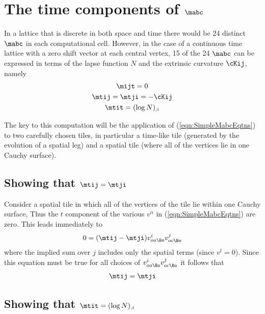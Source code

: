\documentclass[a4paper,12pt]{article}
\numberwithin{equation}{section}
\begin{document}
\section{The time components of $\mabc$}
\label{sec:TimeCompsMabc}

In a lattice that is discrete in both space and time there would be 24 distinct $\mabc$ in
each computational cell. However, in the case of a continuous time lattice with a zero shift
vector at each central vertex, 15 of the 24 $\mabc$ can be expressed in terms of the lapse
function $N$ and the extrinsic curvature $\cKij$, namely
\begin{gather}
   \mijt = 0\\
   \mtij = \mtji = - \cKij\\
   \mtit = (\log N)_{,i}
\end{gather}

The key to this computation will be the application of (\ref{eqn:SimpleMabcEqtns}) to two
carefully chosen tiles, in particular a time-like tile (generated by the evolution of a
spatial leg) and a spatial tile (where all of the vertices lie in one Cauchy surface).

\subsection*{Showing that $\mtij = \mtji$}

Consider a spatial tile in which all of the vertices of the tile lie within one Cauchy
surface, Thus the $t$ component of the various $v^\alpha$ in (\ref{eqn:SimpleMabcEqtns}) are
zero. This leads immediately to
\begin{align}
   0 = (\mtij-\mtji)v^i_{oa\Bo} v^j_{oc\Bo}
\end{align}
where the implied sum over $j$ includes only the spatial terms (since $v^t=0$).
Since this equation must be true for all choices of $v^i_{oa\Bo} v^j_{oc\Bo}$ it follows that
\begin{align}
   \label{eqn:mtijsymm}
   \mtij = \mtji
\end{align}

\subsection*{Showing that $\mtit = (\log N)_{,i}$}
\end{document}
